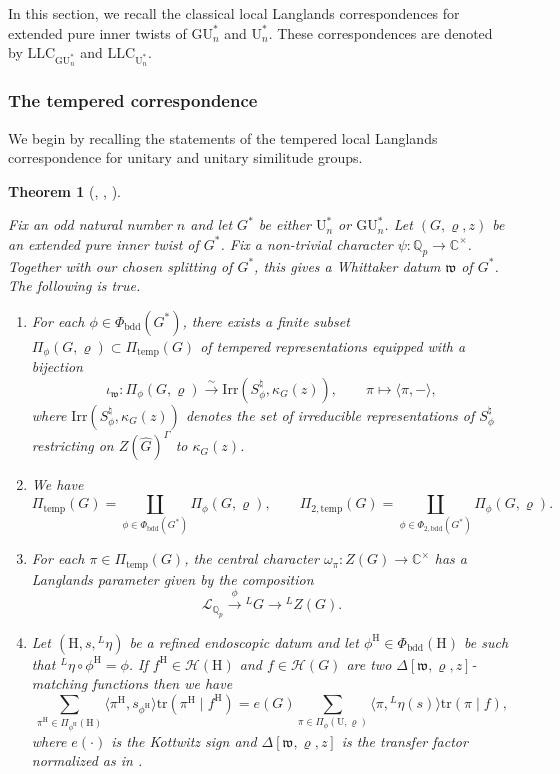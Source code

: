 \documentclass[reqno,11pt]{amsart}
\newtheorem{theorem}{Theorem}[section]
\theoremstyle{remark}
\newcommand{\GU}{\mathrm{GU}}
\newcommand{\U}{\mathrm{U}}
\newcommand{\C}{\mathbb{C}}
\newcommand{\Irr}{\mathrm{Irr}}
\newcommand{\tr}{\mathrm{tr}}
\newcommand{\mc}{\mathcal}
\newcommand{\mf}{\mathfrak}
\newcommand{\Q}{\mathbb{Q}}
\newcommand{\LL}{{}^L}
\newcommand{\Leta}{{}^L\eta}
\newcommand{\temp}{\mathrm{temp}}
\newcommand{\mH}{\mathrm{H}}
\newcommand{\bdd}{\mathrm{bdd}}
\newcommand{\LLC}{\mathrm{LLC}}
\begin{document}
In this section, we recall the classical local Langlands correspondences for extended pure inner twists of $\GU^*_n$ and $\U^*_n$. These correspondences are denoted by $\LLC_{\GU^*_n}$ and $\LLC_{\U^*_n}$.

\subsubsection{The tempered correspondence}
We begin by recalling the statements of the tempered local Langlands correspondence for unitary and unitary similitude groups.

\begin{theorem}[{\cite[Theorem 1.6.1]{KMSW}, \cite[Theorem 2.5.1, Theorem 3.2.1]{Mok}, \cite[Theorem 2.16, \S 3]{BMN}}]  \label{itm: local}

Fix an odd natural number $n$ and let $G^*$ be either $\U^*_n$ or $\GU^*_n$. Let $(G, \varrho, z)$ be an extended pure inner twist of $G^*$. Fix a non-trivial character $\psi: \Q_{p} \to \C^{\times}$. Together with our chosen splitting of $G^*$, this gives a Whittaker datum $\mf{w}$ of $G^*$. The following is true.
\begin{enumerate}
    \item For each $\phi \in \Phi_{\bdd}(G^*)$, there exists a finite subset $\Pi_{\phi}(G, \varrho) \subset \Pi_{\temp}(G)$ of tempered representations equipped with a bijection 
\[
\iota_{\mf{w}}: \Pi_{\phi} (G, \varrho) \xrightarrow{\sim} \Irr (S^{\natural}_{\phi}, \kappa_G(z)), \qquad \pi \mapsto \langle \pi, - \rangle,
\]
where $\Irr (S^{\natural}_{\phi}, \kappa_G(z))$ denotes the set of irreducible representations of $S^{\natural}_{\phi}$ restricting on $Z(\widehat{G})^{\Gamma}$ to $\kappa_G(z)$. 

\item We have 
\begin{equation*}
    \Pi_{\temp}(G) = \coprod_{\phi \in \Phi_{\bdd} (G^*)} \Pi_{\phi} (G, \varrho), \quad \quad
    \Pi_{2, \temp}(G) = \coprod_{\phi \in \Phi_{2, \bdd} (G^*)} \Pi_{\phi} (G, \varrho).
\end{equation*}
\item 
For each $\pi \in \Pi_{\temp}(G)$, the central character $\omega_{\pi} :  Z(G) \longrightarrow \C^{\times} $ has a Langlands parameter given by the composition
\[
\mc{L}_{\Q_p} \xrightarrow{\phi} \LL G  \xrightarrow{} \LL Z(G).
\]

\item Let $(\mathrm{H}, s, \Leta)$ be a refined endoscopic datum and let $\phi^{\mH} \in \Phi_{\bdd}(\mH)$ be such that $\Leta \circ \phi^{\mH} = \phi$. If $f^{\mH} \in \mathcal{H}(\mathrm{H})$ and $f \in \mathcal{H}(G)$ are two $\Delta[\mf{w}, \varrho, z]$-matching functions then we have
\begin{equation*}
 \displaystyle \sum_{\pi^{\mH} \in \Pi_{\phi^{\mH}}(\mH)} \langle \pi^{\mH}, s_{\phi^{\mH}} \rangle\tr(\pi^{\mH} \mid f^{\mH})   = e(G) \sum_{\pi \in \Pi_{\phi}(\U, \varrho)} \langle \pi, \Leta(s)\rangle \tr(\pi \mid f),
 \end{equation*}
 where $e( \cdot)$ is the Kottwitz sign and $\Delta[\mf{w}, \varrho, z]$ is the transfer factor normalized as in \cite{BMN}.


\end{enumerate}
\end{theorem}
\end{document}
